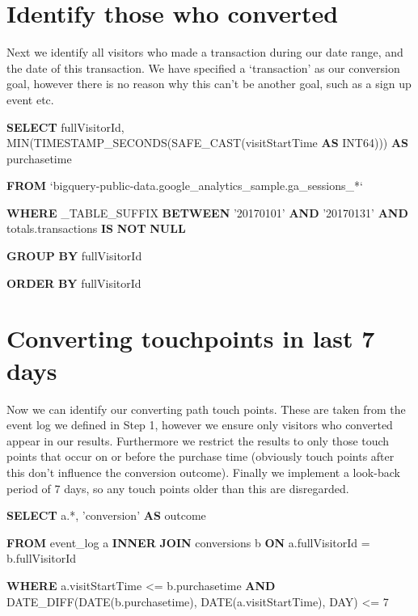 \documentclass[]{book}
\newenvironment{Shaded}{\begin{snugshade}}{\end{snugshade}}
\newcommand{\KeywordTok}[1]{\textcolor[rgb]{0.13,0.29,0.53}{\textbf{#1}}}
\newcommand{\DataTypeTok}[1]{\textcolor[rgb]{0.13,0.29,0.53}{#1}}
\newcommand{\DecValTok}[1]{\textcolor[rgb]{0.00,0.00,0.81}{#1}}
\newcommand{\StringTok}[1]{\textcolor[rgb]{0.31,0.60,0.02}{#1}}
\newcommand{\FunctionTok}[1]{\textcolor[rgb]{0.00,0.00,0.00}{#1}}
\newcommand{\NormalTok}[1]{#1}
\begin{document}
\section{Identify those who
converted}\label{identify-those-who-converted}

Next we identify all visitors who made a transaction during our date
range, and the date of this transaction. We have specified a
`transaction' as our conversion goal, however there is no reason why
this can't be another goal, such as a sign up event etc.

\begin{Shaded}
\begin{Highlighting}[]
    \KeywordTok{SELECT}\NormalTok{ fullVisitorId, }
           \FunctionTok{MIN}\NormalTok{(TIMESTAMP_SECONDS(SAFE_CAST(visitStartTime }\KeywordTok{AS}\NormalTok{ INT64)))  }\KeywordTok{AS}\NormalTok{ purchasetime}

    \KeywordTok{FROM}\NormalTok{ `bigquery-public-data.google_analytics_sample.ga_sessions_*`}

    \KeywordTok{WHERE}\NormalTok{ _TABLE_SUFFIX }\KeywordTok{BETWEEN} \StringTok{'20170101'} \KeywordTok{AND} \StringTok{'20170131'}
     \KeywordTok{AND}\NormalTok{ totals.transactions }\KeywordTok{IS} \KeywordTok{NOT} \KeywordTok{NULL}

    \KeywordTok{GROUP} \KeywordTok{BY}\NormalTok{ fullVisitorId}

    \KeywordTok{ORDER} \KeywordTok{BY}\NormalTok{ fullVisitorId}
\end{Highlighting}
\end{Shaded}

\section{Converting touchpoints in last 7
days}\label{converting-touchpoints-in-last-7-days}

Now we can identify our converting path touch points. These are taken
from the event log we defined in Step 1, however we ensure only visitors
who converted appear in our results. Furthermore we restrict the results
to only those touch points that occur on or before the purchase time
(obviously touch points after this don't influence the conversion
outcome). Finally we implement a look-back period of 7 days, so any
touch points older than this are disregarded.

\begin{Shaded}
\begin{Highlighting}[]
  \KeywordTok{SELECT}\NormalTok{ a.*,}
         \StringTok{'conversion'} \KeywordTok{AS}\NormalTok{ outcome}

  \KeywordTok{FROM}\NormalTok{ event_log a}
    \KeywordTok{INNER} \KeywordTok{JOIN}\NormalTok{ conversions b }\KeywordTok{ON}\NormalTok{ a.fullVisitorId = b.fullVisitorId  }

  \KeywordTok{WHERE}\NormalTok{ a.visitStartTime <= b.purchasetime }
    \KeywordTok{AND}\NormalTok{ DATE_DIFF(}\DataTypeTok{DATE}\NormalTok{(b.purchasetime), }\DataTypeTok{DATE}\NormalTok{(a.visitStartTime), }\DataTypeTok{DAY}\NormalTok{)  <= }\DecValTok{7}
\end{Highlighting}
\end{Shaded}
\end{document}
